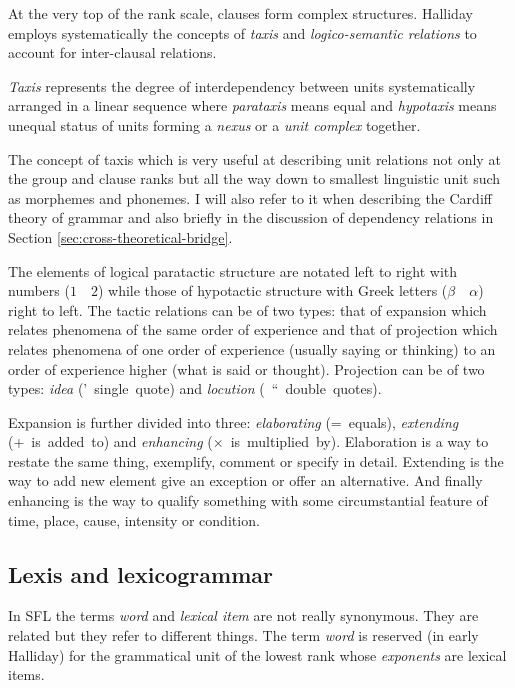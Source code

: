 At the very top of the rank scale, clauses form complex structures. Halliday employs systematically the concepts of \textit{taxis} and \textit{logico-semantic relations} to account for inter-clausal relations. 

\begin{definition}[Taxis]\label{def:taxis}
    \textit{Taxis} represents the degree of interdependency between units systematically arranged in a linear sequence where \textit{parataxis} means equal and \textit{hypotaxis} means unequal status of units forming a \textit{nexus} or a \textit{unit complex} together.
\end{definition}

The concept of taxis which is very useful at describing unit relations not only at the group and clause ranks but all the way down to smallest linguistic unit such as morphemes and phonemes. I will also refer to it when describing the Cardiff theory of grammar and also briefly in the discussion of dependency relations in Section \ref{sec:cross-theoretical-bridge}.

The elements of logical paratactic structure are notated left to right with numbers ($1\quad2$) while those of hypotactic structure with Greek letters ($\beta\quad\alpha$) right to left. The tactic relations can be of two types: that of expansion which relates phenomena of the same order of experience and that of projection which relates phenomena of one order of experience (usually saying or thinking) to an order of experience higher (what is said or thought). Projection can be of two types: \textit{idea} \mbox{(' single quote)} and \textit{locution} \mbox{( `` double quotes)}.

Expansion is further divided into three: \textit{elaborating} \mbox{(= equals)}, \textit{extending} \mbox{(+ is added to)} and \textit{enhancing} \mbox{($\times$ is multiplied by)}. Elaboration is a way to restate the same thing, exemplify, comment or specify in detail. Extending is the way to add new element give an exception or offer an alternative. And finally enhancing is the way to qualify something with some circumstantial feature of time, place, cause, intensity or condition. 

\subsection{Lexis and lexicogrammar}
In SFL the terms \textit{word} and \textit{lexical item} are not really synonymous. They are related but they refer to different things. The term \textit{word} is reserved (in early Halliday) for the grammatical unit of the lowest rank whose \textit{exponents} are lexical items. %

